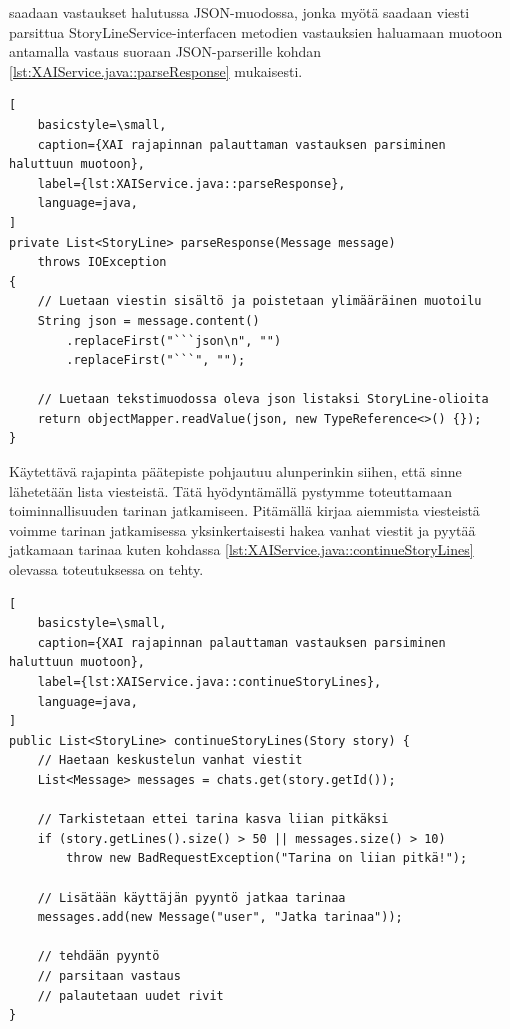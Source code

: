 saadaan vastaukset halutussa JSON-muodossa, jonka myötä saadaan viesti
parsittua StoryLineService-interfacen metodien vastauksien haluamaan
muotoon antamalla vastaus suoraan JSON-parserille kohdan
\ref{lst:XAIService.java::parseResponse} mukaisesti.

\begin{lstlisting}[
    basicstyle=\small,
    caption={XAI rajapinnan palauttaman vastauksen parsiminen haluttuun muotoon},
    label={lst:XAIService.java::parseResponse},
    language=java,
]
private List<StoryLine> parseResponse(Message message)
    throws IOException
{
    // Luetaan viestin sisältö ja poistetaan ylimääräinen muotoilu
    String json = message.content()
        .replaceFirst("```json\n", "")
        .replaceFirst("```", "");

    // Luetaan tekstimuodossa oleva json listaksi StoryLine-olioita
    return objectMapper.readValue(json, new TypeReference<>() {});
}
\end{lstlisting}

Käytettävä rajapinta päätepiste pohjautuu alunperinkin siihen, että sinne
lähetetään lista viesteistä. Tätä hyödyntämällä pystymme toteuttamaan
toiminnallisuuden tarinan jatkamiseen. Pitämällä kirjaa aiemmista viesteistä
voimme tarinan jatkamisessa yksinkertaisesti hakea vanhat viestit ja pyytää
jatkamaan tarinaa kuten kohdassa \ref{lst:XAIService.java::continueStoryLines}
olevassa toteutuksessa on tehty.

\begin{lstlisting}[
    basicstyle=\small,
    caption={XAI rajapinnan palauttaman vastauksen parsiminen haluttuun muotoon},
    label={lst:XAIService.java::continueStoryLines},
    language=java,
]
public List<StoryLine> continueStoryLines(Story story) {
    // Haetaan keskustelun vanhat viestit
    List<Message> messages = chats.get(story.getId());

    // Tarkistetaan ettei tarina kasva liian pitkäksi
    if (story.getLines().size() > 50 || messages.size() > 10)
        throw new BadRequestException("Tarina on liian pitkä!");

    // Lisätään käyttäjän pyyntö jatkaa tarinaa
    messages.add(new Message("user", "Jatka tarinaa"));

    // tehdään pyyntö
    // parsitaan vastaus
    // palautetaan uudet rivit
}
\end{lstlisting}
